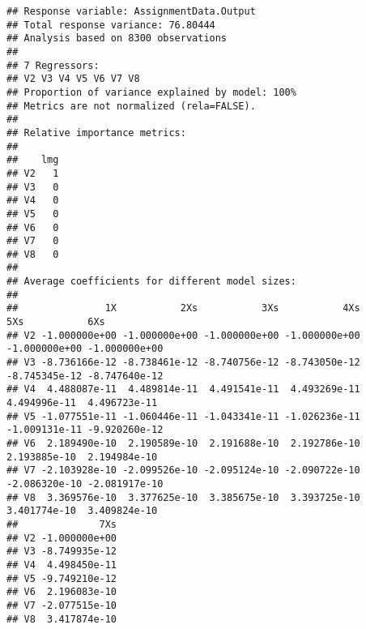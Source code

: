 \documentclass[]{article}
\newenvironment{Shaded}{\begin{snugshade}}{\end{snugshade}}
\newcommand{\KeywordTok}[1]{\textcolor[rgb]{0.13,0.29,0.53}{\textbf{#1}}}
\newcommand{\DataTypeTok}[1]{\textcolor[rgb]{0.13,0.29,0.53}{#1}}
\newcommand{\DecValTok}[1]{\textcolor[rgb]{0.00,0.00,0.81}{#1}}
\newcommand{\StringTok}[1]{\textcolor[rgb]{0.31,0.60,0.02}{#1}}
\newcommand{\OperatorTok}[1]{\textcolor[rgb]{0.81,0.36,0.00}{\textbf{#1}}}
\newcommand{\NormalTok}[1]{#1}
\begin{document}
\begin{Shaded}
\end{Shaded}

\begin{verbatim}
## Response variable: AssignmentData.Output 
## Total response variance: 76.80444 
## Analysis based on 8300 observations 
## 
## 7 Regressors: 
## V2 V3 V4 V5 V6 V7 V8 
## Proportion of variance explained by model: 100%
## Metrics are not normalized (rela=FALSE). 
## 
## Relative importance metrics: 
## 
##    lmg
## V2   1
## V3   0
## V4   0
## V5   0
## V6   0
## V7   0
## V8   0
## 
## Average coefficients for different model sizes: 
## 
##               1X           2Xs           3Xs           4Xs           5Xs           6Xs
## V2 -1.000000e+00 -1.000000e+00 -1.000000e+00 -1.000000e+00 -1.000000e+00 -1.000000e+00
## V3 -8.736166e-12 -8.738461e-12 -8.740756e-12 -8.743050e-12 -8.745345e-12 -8.747640e-12
## V4  4.488087e-11  4.489814e-11  4.491541e-11  4.493269e-11  4.494996e-11  4.496723e-11
## V5 -1.077551e-11 -1.060446e-11 -1.043341e-11 -1.026236e-11 -1.009131e-11 -9.920260e-12
## V6  2.189490e-10  2.190589e-10  2.191688e-10  2.192786e-10  2.193885e-10  2.194984e-10
## V7 -2.103928e-10 -2.099526e-10 -2.095124e-10 -2.090722e-10 -2.086320e-10 -2.081917e-10
## V8  3.369576e-10  3.377625e-10  3.385675e-10  3.393725e-10  3.401774e-10  3.409824e-10
##              7Xs
## V2 -1.000000e+00
## V3 -8.749935e-12
## V4  4.498450e-11
## V5 -9.749210e-12
## V6  2.196083e-10
## V7 -2.077515e-10
## V8  3.417874e-10
\end{verbatim}

\begin{Shaded}
\end{Shaded}
\end{document}
